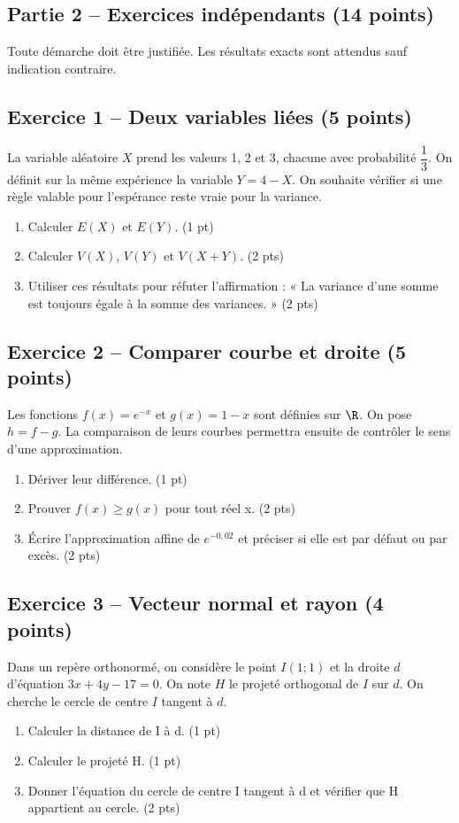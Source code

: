\clearpage\subsection*{Partie 2 -- Exercices indépendants (14 points)}
Toute démarche doit être justifiée. Les résultats exacts sont attendus sauf indication contraire.
\subsection*{Exercice 1 -- Deux variables liées (5 points)}
La variable aléatoire $X$ prend les valeurs 1, 2 et 3, chacune avec probabilité $\dfrac13$. On définit sur la même expérience la variable $Y=4-X$. On souhaite vérifier si une règle valable pour l’espérance reste vraie pour la variance.
\begin{enumerate}
\item Calculer $E(X)$ et $E(Y)$. \hfill(1 pt)
\item Calculer $V(X)$, $V(Y)$ et $V(X+Y)$. \hfill(2 pts)
\item Utiliser ces résultats pour réfuter l’affirmation : « La variance d’une somme est toujours égale à la somme des variances. » \hfill(2 pts)
\end{enumerate}
\subsection*{Exercice 2 -- Comparer courbe et droite (5 points)}
Les fonctions $f(x)=e^{-x}$ et $g(x)=1-x$ sont définies sur $\R$. On pose $h=f-g$. La comparaison de leurs courbes permettra ensuite de contrôler le sens d’une approximation.
\begin{enumerate}
\item Dériver leur différence. \hfill(1 pt)
\item Prouver $f(x)\geq g(x)$ pour tout réel x. \hfill(2 pts)
\item Écrire l’approximation affine de $e^{-0{,}02}$ et préciser si elle est par défaut ou par excès. \hfill(2 pts)
\end{enumerate}
\subsection*{Exercice 3 -- Vecteur normal et rayon (4 points)}
Dans un repère orthonormé, on considère le point $I(1;1)$ et la droite $d$ d’équation $3x+4y-17=0$. On note $H$ le projeté orthogonal de $I$ sur $d$. On cherche le cercle de centre $I$ tangent à $d$.
\begin{enumerate}
\item Calculer la distance de I à d. \hfill(1 pt)
\item Calculer le projeté H. \hfill(1 pt)
\item Donner l’équation du cercle de centre I tangent à d et vérifier que H appartient au cercle. \hfill(2 pts)
\end{enumerate}
